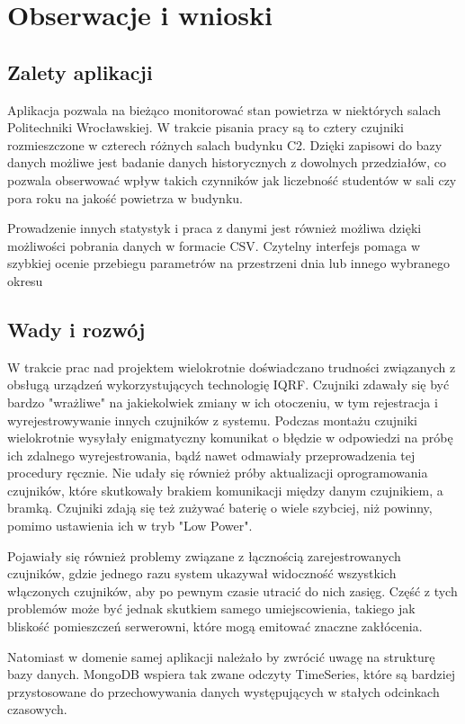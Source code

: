 \section{Obserwacje i wnioski}

\subsection{Zalety aplikacji}

Aplikacja pozwala na bieżąco monitorować stan powietrza w niektórych salach Politechniki Wrocławskiej. W trakcie pisania pracy są to
cztery czujniki rozmieszczone w czterech różnych salach budynku C2. Dzięki zapisowi do bazy danych możliwe jest badanie danych historycznych z dowolnych
przedziałów, co pozwala obserwować wpływ takich czynników jak liczebność studentów w sali czy pora roku na jakość powietrza w budynku.

Prowadzenie innych statystyk i praca z danymi jest również możliwa dzięki możliwości pobrania danych w formacie CSV. Czytelny interfejs pomaga w 
szybkiej ocenie przebiegu parametrów na przestrzeni dnia lub innego wybranego okresu

\subsection{Wady i rozwój}

W trakcie prac nad projektem wielokrotnie doświadczano trudności związanych z obsługą urządzeń wykorzystujących technologię IQRF. Czujniki zdawały się
być bardzo "wrażliwe" na jakiekolwiek zmiany w ich otoczeniu, w tym rejestracja i wyrejestrowywanie innych czujników z systemu. Podczas montażu
czujniki wielokrotnie wysyłały enigmatyczny komunikat o błędzie w odpowiedzi na próbę ich zdalnego wyrejestrowania, bądź nawet odmawiały
przeprowadzenia tej procedury ręcznie. 
Nie udały się również próby aktualizacji oprogramowania czujników, które skutkowały brakiem komunikacji między danym czujnikiem, a bramką. 
Czujniki zdają się też zużywać baterię o wiele szybciej, niż powinny, pomimo ustawienia ich w tryb "Low Power".

Pojawiały się również problemy związane z łącznością zarejestrowanych czujników, gdzie jednego razu system ukazywał widoczność wszystkich włączonych
czujników, aby po pewnym czasie utracić do nich zasięg. Część z tych problemów może być jednak skutkiem samego umiejscowienia, takiego jak bliskość 
pomieszczeń serwerowni, które mogą emitować znaczne zakłócenia.

Natomiast w domenie samej aplikacji należało by zwrócić uwagę na strukturę bazy danych. MongoDB wspiera tak zwane odczyty TimeSeries, które są
bardziej przystosowane do przechowywania danych występujących w stałych odcinkach czasowych.

